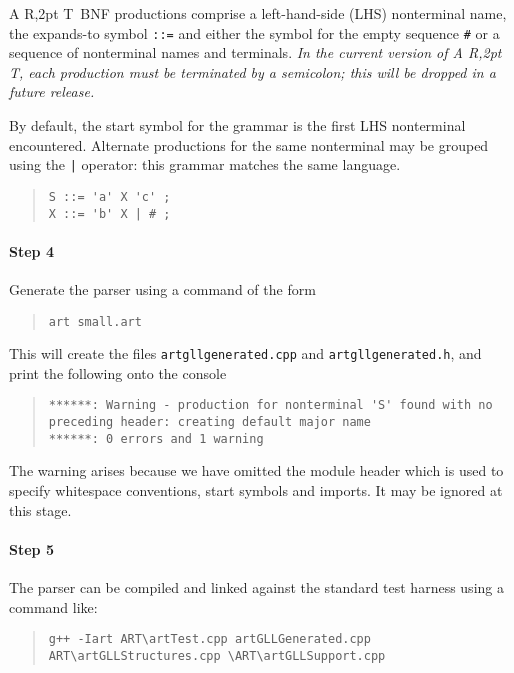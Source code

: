 \documentclass[11pt]{article}
\newcommand{\art}{{\rm A\kern -2pt R\kern -2,2pt T}}
\begin{document}
\art\ BNF productions comprise a left-hand-side (LHS) nonterminal name,
the expands-to symbol {\tt ::=} and either the symbol for the empty
sequence \verb+#+ or a sequence of nonterminal names and terminals.
{\em In the current version of \art, each production must be terminated
  by a semicolon; this will be dropped in a future release.}

By default, the start symbol for the grammar is the first LHS
nonterminal encountered. Alternate productions for the same
nonterminal may be grouped using the {\tt |} operator: this grammar
matches the same language.

\begin{quote}
\begin{verbatim}
S ::= 'a' X 'c' ;
X ::= 'b' X | # ;
\end{verbatim}
\end{quote}

\paragraph{Step 4}
Generate the parser using a command of the form
\begin{quote}
\begin{verbatim}
art small.art
\end{verbatim}
\end{quote}

This will create the files \verb+artgllgenerated.cpp+ and
\verb+artgllgenerated.h+, and print the following onto the console
\begin{quote}
\begin{verbatim}
******: Warning - production for nonterminal 'S' found with no 
preceding header: creating default major name
******: 0 errors and 1 warning
\end{verbatim}
\end{quote}
The warning arises because we have omitted the module header which is
used to specify whitespace conventions, start symbols and imports. It
may be ignored at this stage.

\paragraph{Step 5}
The parser can be compiled and linked against the standard test harness using a command like:
\begin{quote}
\small
\hspace*{-3cm}
\verb!g++ -Iart ART\artTest.cpp artGLLGenerated.cpp ART\artGLLStructures.cpp \ART\artGLLSupport.cpp!
\end{quote}
\end{document}
